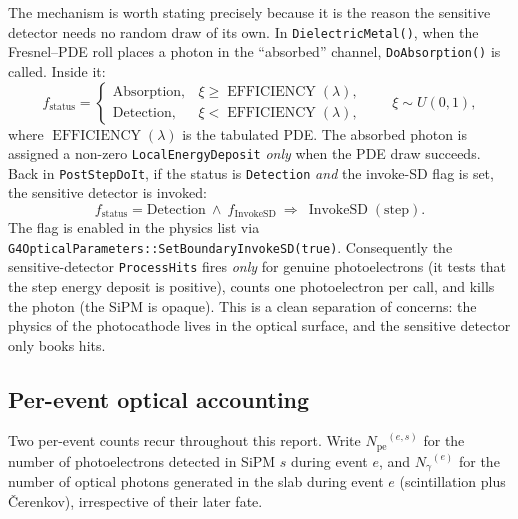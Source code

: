\documentclass[11pt,a4paper]{article}
\newcommand{\pe}{\ensuremath{N_{\mathrm{pe}}}}
\newcommand{\ngam}{\ensuremath{N_{\gamma}}}
\begin{document}
The mechanism is worth stating precisely because it is the reason the sensitive
detector needs no random draw of its own. In \texttt{DielectricMetal()},
when the Fresnel--PDE roll places a photon in the ``absorbed''
channel, \texttt{DoAbsorption()} is called. Inside it:
\begin{equation}
  f_{\mathrm{status}} =
  \begin{cases}
    \mathrm{Absorption}, & \xi \ge \operatorname{EFFICIENCY}(\lambda),\\[2pt]
    \mathrm{Detection},  & \xi <  \operatorname{EFFICIENCY}(\lambda),
  \end{cases}
  \qquad \xi \sim U(0,1),
\end{equation}
where $\operatorname{EFFICIENCY}(\lambda)$ is the tabulated PDE. The absorbed
photon is assigned a non-zero
\texttt{LocalEnergyDeposit} \emph{only} when the PDE draw succeeds. Back in
\texttt{PostStepDoIt}, if the status is \texttt{Detection} \emph{and} the
invoke-SD flag is set, the sensitive detector is invoked:
\begin{equation}
  f_{\mathrm{status}} = \mathrm{Detection}\ \wedge\ f_{\mathrm{InvokeSD}}
  \ \Longrightarrow\ \operatorname{InvokeSD}(\text{step}).
\end{equation}
The flag is enabled in the physics list via
\texttt{G4OpticalParameters::SetBoundaryInvokeSD(true)}. Consequently the
sensitive-detector \texttt{ProcessHits} fires \emph{only} for genuine
photoelectrons (it tests that the step energy deposit is positive), counts one
photoelectron per call, and kills the photon (the SiPM is opaque). This is a clean
separation of concerns: the physics of the photocathode lives in the optical
surface, and the sensitive detector only books hits.

\subsection{Per-event optical accounting}

Two per-event counts recur throughout this report. Write $\pe^{(e,s)}$ for the
number of photoelectrons detected in SiPM $s$ during event $e$, and
$\ngam^{(e)}$ for the number of optical photons generated in the slab during
event $e$ (scintillation plus \v{C}erenkov), irrespective of their later fate.
\end{document}

